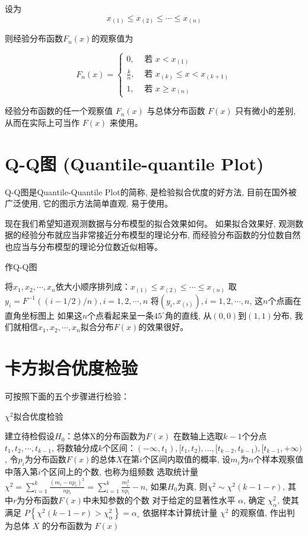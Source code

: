 设为
$$
x_{(1)} \leq x_{(2)} \leq \cdots \leq x_{(n)}
$$

则经验分布函数$F_{n}(x)$的观察值为

$$
F_{n}(x)=\left\{\begin{array}{ll}
0, & \text { 若 } x<x_{(1)} \\
\frac{k}{n}, & \text { 若 } x_{(k)} \leq x<x_{(k+1)} \\
1, & \text { 若 } x \geq x_{(n)}
\end{array}\right.
$$

经验分布函数的任一个观察值 $F_n(x)$ 与总体分布函数 $F(x)$ 只有微小的差别, 从而在实际上可当作 $F(x)$ 来使用。 

\section{Q-Q图 (Quantile-quantile Plot)}

Q-Q图是Quantile-Quantile Plot的简称, 是检验拟合优度的好方法, 目前在国外被广泛使用, 它的图示方法简单直观, 易于使用。 

现在我们希望知道观测数据与分布模型的拟合效果如何。 如果拟合效果好, 观测数据的经验分布就应当非常接近分布模型的理论分布, 而经验分布函数的分位数自然也应当与分布模型的理论分位数近似相等。 

\begin{algorithm}
    \caption{作Q-Q图}
    
将$x_1,x_2,\cdots,x_n$依大小顺序排列成：$x_{(1)}\le x_{(2)}\le\cdots\le x_{(n)}$\;
取$y_i=F^{-1}((i-1/2)/n), i=1,2,\cdots,n$\;
将$(y_i,x_{(i)}), i=1,2,\cdots,n$, 这$n$个点画在直角坐标图上\;
如果这$n$个点看起来呈一条$45^\circ$角的直线, 从$(0,0)$到$(1,1)$分布, 我们就相信$x_1,x_2,\cdots,x_n$拟合分布$F(x)$的效果很好。 
\end{algorithm}

\section{卡方拟合优度检验}

可按照下面的五个步骤进行检验：

\begin{algorithm}
\caption{$\chi^2$拟合优度检验}
建立待检假设$H_0$：总体X的分布函数为$F(x)$\;
在数轴上选取$k-1$个分点$t_1,t_2,\cdots,t_{k-1}$, 将数轴分成$k$个区间：$(-\infty,t_1), [t_1,t_2), …, [t_{k-2},t_{k-1}), [t_{k-1},+\infty)$, 令$p_i$为分布函数$F(x)$的总体$X$在第$i$个区间内取值的概率, 设$m_i$为$n$个样本观察值中落入第$i$个区间上的个数, 也称为组频数\;
选取统计量$\chi^2=\sum_{i=1}^{k}\frac{(m_i-np_i)^2}{np_i}=\sum_{i=1}^{k}{\frac{m_i^2}{np_i}-n}$, 如果$H_0$为真, 则$\chi^2 \sim \chi^2(k-1-r)$, 其中$r$为分布函数$F(x)$中未知参数的个数\;
对于给定的显著性水平 \( \alpha \), 确定 \( \chi_{\alpha}^{2} \), 使其满足 \( P\left\{\chi^{2}(k-1-r)>\chi_{\alpha}^{2}\right\}=\alpha_{\circ} \) \;
依据样本计算统计量 \( \chi^{2} \) 的观察值, 作出判
为总体 \( X \) 的分布函数为 \( F(x) \) \;
\end{algorithm}

